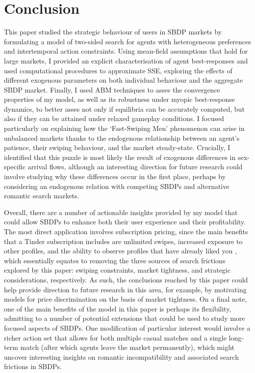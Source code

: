 \section{Conclusion}
\label{sec:section5}
This paper studied the strategic behaviour of users in SBDP markets by formulating a model of two-sided search for agents with heterogeneous preferences and intertemporal action constraints. 
Using mean-field assumptions that hold for large markets, I provided an explicit characterisation of agent best-responses and used computational procedures to approximate SSE, exploring the effects of different exogenous parameters on both individual behaviour and the aggregate SBDP market.
Finally, I used ABM techniques to asses the convergence properties of my model, as well as its robustness under myopic best-response dynamics, to better asses not only if equilibria can be accurately computed, but also if they can be attained under relaxed gameplay conditions.
I focused particularly on explaining how the `Fast-Swiping Men' phenomenon can arise in unbalanced markets thanks to the endogenous relationship between an agent's patience, their swiping behaviour, and the market steady-state. 
Crucially, I identified that this puzzle is most likely the result of exogenous differences in sex-specific arrival flows, although an interesting direction for future research could involve studying why these differences occur in the first place, perhaps by considering an endogenous relation with competing SBDPs and alternative romantic search markets. 

Overall, there are a number of actionable insights provided by my model that could allow SBDPs to enhance both their user experience and their profitability.
The most direct application involves subscription pricing, since the main benefits that a Tinder subscription includes are unlimited swipes, increased exposure to other profiles, and the ability to observe profiles that have already liked you \cite{web:tinder_subscription}, which essentially equates to removing the three sources of search frictions explored by this paper: swiping constraints, market tightness, and strategic considerations, respectively.
As such, the conclusions reached by this paper could help provide direction to future research in this area, for example, by motivating models for price discrimination on the basis of market tightness.
On a final note, one of the main benefits of the model in this paper is perhaps its flexibility, admitting to a number of potential extensions that could be used to study more focused aspects of SBDPs. 
One modification of particular interest would involve a richer action set that allows for both multiple casual matches and a single long-term match (after which agents leave the market permanently), which might uncover interesting insights on romantic incompatibility and associated search frictions in SBDPs.